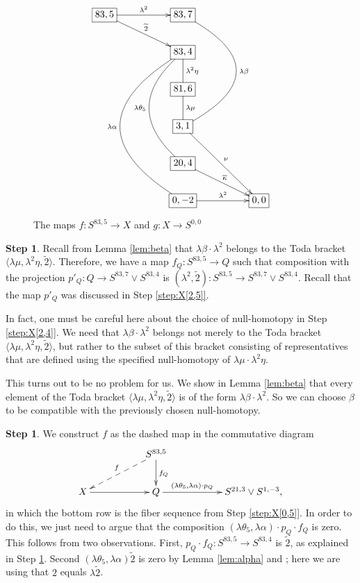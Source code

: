 \documentclass{amsart}
\theoremstyle{definition}
\newtheorem{step}[thm]{Step}
\newcommand{\map}{\rightarrow}
\newcommand{\Xtwofive}{Q}
\newcommand{\hsf}{\widetilde{2}}
\begin{document}
\begin{figure}[h!]
\caption{The maps $f: S^{83, 5} \map X$ and $g: X \map S^{0,0}$\label{fig:maps}}
$$\xymatrix{
*+[F]{83, 5} \ar[rr]^-{\lambda^2} \ar[rrd]^-{\hsf} && *+[F]{83, 7}  \ar@{-}@/_-55pt/[ddd]^-{\lambda \beta} && \\
 && *+[F]{83, 4} \ar@{-}[d]^-{\lambda^2 \eta} \ar@{-}@/^-35pt/[ddd]_-{\lambda \theta_5} \ar@{-}@/^-65pt/[dddd]_-{\lambda \alpha} &&\\
 && *+[F]{81, 6} \ar@{-}[d]^-{\lambda \mu} &&\\
 && *+[F]{3, 1} \ar[rrdd]^-{\nu} &&\\
 && *+[F]{20, 4} \ar[rrd]^-{\overline{\kappa}} &&\\
 && *+[F]{0, -2} \ar[rr]^-{\lambda^2} && *+[F]{0,0}
}$$
\end{figure}

\begin{step}
\label{step:f[2,5]}
Recall from Lemma \ref{lem:beta} that
$\lambda \beta \cdot \lambda^2$ belongs 
to the Toda bracket
$\langle \lambda \mu,  \lambda^2 \eta, \hsf \rangle$.
Therefore,
we have a map $f_\Xtwofive: S^{83,5} \rightarrow \Xtwofive$ 
such that composition
with the projection $p'_\Xtwofive: \Xtwofive \map S^{83,7} \vee S^{83,4}$ is 
$(\lambda^2, \hsf): S^{83,5} \rightarrow S^{83,7} \vee S^{83,4}$.
Recall that the map $p'_\Xtwofive$ was discussed
in Step \ref{step:X[2,5]}.

In fact, one must be careful here about the choice of null-homotopy
in Step \ref{step:X[2,4]}.  We need that $\lambda \beta \cdot \lambda^2$
belongs not merely to the Toda bracket 
$\langle \lambda \mu, \lambda^2 \eta, \hsf \rangle$, but rather to
the subset of this bracket consisting of representatives that are
defined using the specified null-homotopy
of $\lambda \mu \cdot \lambda^2 \eta$.

This turns out to be no problem for us.  We show in
Lemma \ref{lem:beta} that every element of the Toda bracket
$\langle \lambda \mu, \lambda^2 \eta, \hsf \rangle$ is of the form
$\lambda \beta \cdot \lambda^2$.  So we can choose $\beta$
to be compatible with the previously chosen null-homotopy.
\end{step}

\begin{step}
\label{step:f[0,5]}
We construct $f$ as the dashed map in the commutative diagram
\[
\xymatrix{
&& S^{83,5} \ar[d]^{f_\Xtwofive} \ar@{-->}[dll]_{f} \\
X \ar[rr] &&
\Xtwofive \ar[rr]^-{(\lambda \theta_5, \lambda \alpha) \cdot p_\Xtwofive} &&
S^{21,3} \vee S^{1,-3},
}
\]
in which the bottom row is the fiber sequence from Step \ref{step:X[0,5]}.
In order to do this, we just need to argue that the composition
$(\lambda \theta_5, \lambda \alpha) \cdot p_\Xtwofive \cdot f_\Xtwofive$
is zero.
This follows from two observations.
First,
$p_\Xtwofive \cdot f_\Xtwofive: S^{83,5} \map S^{83,4}$ is $\hsf$,
as explained in Step \ref{step:f[2,5]}.
Second $(\lambda \theta_5, \lambda \alpha) \hsf$
is zero by Lemma \ref{lem:alpha} and \cite{Xu16};
here we are using that $2$ equals $\lambda \hsf$.
\end{step} 
 
\end{document}

